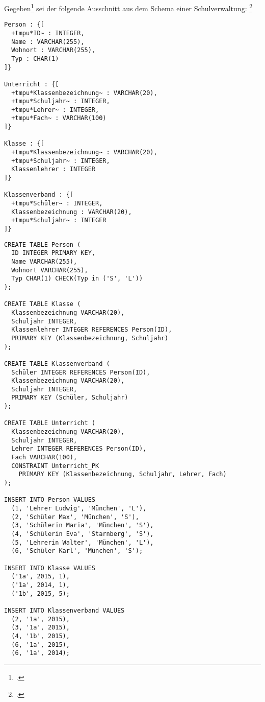 \documentclass{lehramt-informatik-aufgabe}
\begin{document}

Gegeben\footcite{examen:66116:2016:09} sei der folgende Ausschnitt aus
dem Schema einer Schulverwaltung:
\footcite[2. SQL und relationale Algebra]{db:ab:examen-gym-2016-09}

\newcommand{\tmpu}[1]{\underline{\texttt{#1}}}

\begin{Verbatim}[commandchars=+*~]
Person : {[
  +tmpu*ID~ : INTEGER,
  Name : VARCHAR(255),
  Wohnort : VARCHAR(255),
  Typ : CHAR(1)
]}

Unterricht : {[
  +tmpu*Klassenbezeichnung~ : VARCHAR(20),
  +tmpu*Schuljahr~ : INTEGER,
  +tmpu*Lehrer~ : INTEGER,
  +tmpu*Fach~ : VARCHAR(100)
]}

Klasse : {[
  +tmpu*Klassenbezeichnung~ : VARCHAR(20),
  +tmpu*Schuljahr~ : INTEGER,
  Klassenlehrer : INTEGER
]}

Klassenverband : {[
  +tmpu*Schüler~ : INTEGER,
  Klassenbezeichnung : VARCHAR(20),
  +tmpu*Schuljahr~ : INTEGER
]}
\end{Verbatim}

\begin{verbatim}
CREATE TABLE Person (
  ID INTEGER PRIMARY KEY,
  Name VARCHAR(255),
  Wohnort VARCHAR(255),
  Typ CHAR(1) CHECK(Typ in ('S', 'L'))
);

CREATE TABLE Klasse (
  Klassenbezeichnung VARCHAR(20),
  Schuljahr INTEGER,
  Klassenlehrer INTEGER REFERENCES Person(ID),
  PRIMARY KEY (Klassenbezeichnung, Schuljahr)
);

CREATE TABLE Klassenverband (
  Schüler INTEGER REFERENCES Person(ID),
  Klassenbezeichnung VARCHAR(20),
  Schuljahr INTEGER,
  PRIMARY KEY (Schüler, Schuljahr)
);

CREATE TABLE Unterricht (
  Klassenbezeichnung VARCHAR(20),
  Schuljahr INTEGER,
  Lehrer INTEGER REFERENCES Person(ID),
  Fach VARCHAR(100),
  CONSTRAINT Unterricht_PK
    PRIMARY KEY (Klassenbezeichnung, Schuljahr, Lehrer, Fach)
);

INSERT INTO Person VALUES
  (1, 'Lehrer Ludwig', 'München', 'L'),
  (2, 'Schüler Max', 'München', 'S'),
  (3, 'Schülerin Maria', 'München', 'S'),
  (4, 'Schülerin Eva', 'Starnberg', 'S'),
  (5, 'Lehrerin Walter', 'München', 'L'),
  (6, 'Schüler Karl', 'München', 'S');

INSERT INTO Klasse VALUES
  ('1a', 2015, 1),
  ('1a', 2014, 1),
  ('1b', 2015, 5);

INSERT INTO Klassenverband VALUES
  (2, '1a', 2015),
  (3, '1a', 2015),
  (4, '1b', 2015),
  (6, '1a', 2015),
  (6, '1a', 2014);
\end{verbatim}
\end{document}
